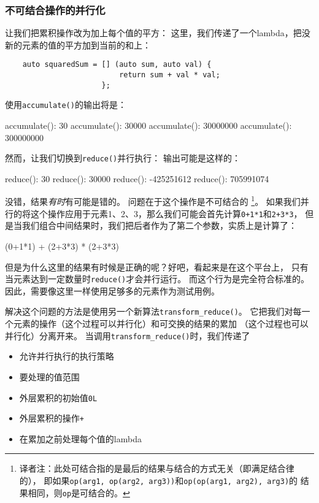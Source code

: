 \subsubsection{不可结合操作的并行化}\label{ch22.6.1.3}
让我们把累积操作改为加上每个值的平方：
这里，我们传递了一个lambda，把没新的元素的值的平方加到当前的和上：
\begin{lstlisting}
    auto squaredSum = [] (auto sum, auto val) {
                          return sum + val * val;
                      };
\end{lstlisting}
使用\texttt{accumulate()}的输出将是：
\begin{blacklisting}
    accumulate(): 30
    accumulate(): 30000
    accumulate(): 30000000
    accumulate(): 300000000
\end{blacklisting}
然而，让我们切换到\texttt{reduce()}并行执行：
输出可能是这样的：
\begin{blacklisting}
    reduce():     30
    reduce():     30000
    reduce():     -425251612
    reduce():     705991074
\end{blacklisting}
没错，结果\emph{有时}有可能是错的。
问题在于这个操作是不可结合的\label{transform动机}
\footnote{译者注：此处可结合指的是最后的结果与结合的方式无关（即满足结合律的），
即如果\texttt{op(arg1, op(arg2, arg3))}和\texttt{op(op(arg1, arg2), arg3)}的
结果相同，则\texttt{op}是可结合的。}。
如果我们并行的将这个操作应用于元素1、2、3，那么我们可能会首先计算\texttt{0+1*1}和\texttt{2+3*3}，
但是当我们组合中间结果时，我们把后者作为了第二个参数，实质上是计算了：
\begin{blacklisting}
    (0+1*1) + (2+3*3) * (2+3*3)
\end{blacklisting}
但是为什么这里的结果有时候是正确的呢？好吧，看起来是在这个平台上，
只有当元素达到一定数量时\texttt{reduce()}才会并行运行。
而这个行为是完全符合标准的。因此，需要像这里一样使用足够多的元素作为测试用例。

解决这个问题的方法是使用另一个新算法\texttt{transform\_reduce()}。
它把我们对每一个元素的操作（这个过程可以并行化）和可交换的结果的累加
（这个过程也可以并行化）分离开来。
当调用\texttt{transform\_reduce()}时，我们传递了
\begin{itemize}
    \item 允许并行执行的执行策略
    \item 要处理的值范围
    \item 外层累积的初始值\texttt{0L}
    \item 外层累积的操作\texttt{+}
    \item 在累加之前处理每个值的lambda
\end{itemize}

